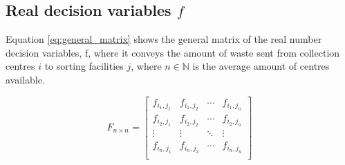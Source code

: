 \documentclass[mscthesis, 11pt]{usiinfthesis}
\theoremstyle{newdefinition}
\begin{document}
\subsection{Real decision variables $f$} \label{sec:real_dec_variables}
Equation \ref{eq:general_matrix} shows the general matrix of the real number decision variables, f, where it conveys the amount of waste sent from collection centres $i$ to sorting facilities $j$, where $n \in \mathbb{N}$ is the average amount of centres available. 


\begin{equation}\label{eq:general_matrix}
    F_{n \times n} =
  \left[ {\begin{array}{cccc}
    f_{i_1, j_1} & f_{i_1, j_2} & \cdots & f_{i_1, j_n}\\
    f_{i_2, j_1} & f_{i_2, j_2} & \cdots & f_{i_2, j_n}\\
    \vdots & \vdots & \ddots & \vdots\\
    f_{i_n, j_1} & f_{i_n, j_2} & \cdots & f_{i_n, j_n}\\
  \end{array} } \right]
\end{equation}
\end{document}
